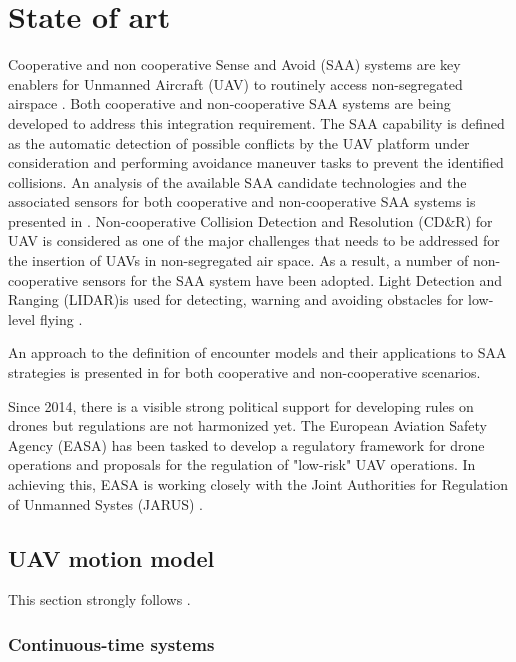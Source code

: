 \chapter{State of art}\label{ch:stateofArt}
\noindent
Cooperative and non cooperative Sense and Avoid (SAA) systems are key enablers for Unmanned Aircraft (UAV) to routinely access non-segregated airspace \cite{spriesterbach2013unmanned}. Both cooperative and non-cooperative SAA systems are being developed to address this integration requirement.
\noindent
The SAA capability is defined as the automatic detection of possible conflicts by the UAV platform under consideration and performing avoidance maneuver tasks to prevent the identified collisions. An analysis of the available SAA candidate technologies and the associated sensors for both cooperative and non-cooperative SAA systems is presented in \cite{muraru2011critical}. Non-cooperative Collision Detection and Resolution (CD\&R) for UAV is considered as one of the major challenges that needs to be addressed \cite{lai2012see} for the insertion of UAVs in non-segregated air space. As a result, a number of non-cooperative sensors for the SAA system have been adopted. Light Detection and Ranging (LIDAR)is used for detecting, warning and avoiding obstacles for low-level flying \cite{sabatini2014lidar}.

An approach to the definition of encounter models and their applications to SAA strategies is presented in \cite{kochenderfer2008encounter} for both cooperative and non-cooperative scenarios.

Since 2014, there is a visible strong political support for developing rules on drones but regulations are not harmonized yet. The European Aviation Safety Agency (EASA) has been tasked to develop a regulatory framework for drone operations and proposals for the regulation of "low-risk" UAV operations. In achieving this, EASA is working closely with the Joint Authorities for Regulation of Unmanned Systes (JARUS) \cite{jarus2016regulations}.


\section{UAV motion model}
\noindent
This section strongly follows \cite{lee2011structure}.

\subsection{Continuous-time systems}\noindent

